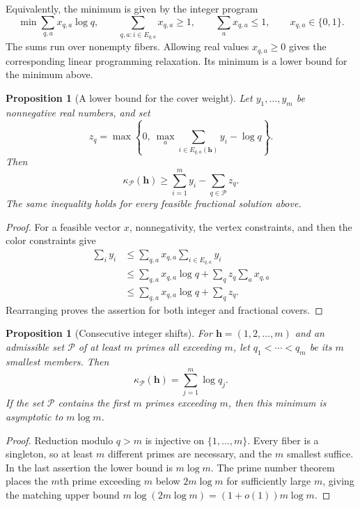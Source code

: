 \documentclass[11pt]{amsart}
\newtheorem{proposition}[theorem]{Proposition}
\theoremstyle{definition}
\theoremstyle{remark}
\begin{document}
Equivalently, the minimum is given by the integer program
\[
\min \sum_{q,a}x_{q,a}\log q,
\qquad
\sum_{q,a:i\in E_{q,a}}x_{q,a}\geq1,
\qquad
\sum_a x_{q,a}\leq1,
\qquad x_{q,a}\in\{0,1\}.
\]
The sums run over nonempty fibers. Allowing real values
$x_{q,a}\geq0$ gives the corresponding linear programming relaxation.
Its minimum is a lower bound for the minimum above.

\begin{proposition}[A lower bound for the cover weight]
\label{prop:dual}
Let $y_1,\ldots,y_m$ be nonnegative real numbers, and set
\[
z_q=\max\left\{0,\ \max_a\sum_{i\in E_{q,a}(\mathbf h)}y_i-\log q\right\}.
\]
Then
\[
\kappa_{\mathcal P}(\mathbf h)\geq\sum_{i=1}^m y_i-\sum_{q\in\mathcal P}z_q.
\]
The same inequality holds for every feasible fractional solution above.
\end{proposition}
\begin{proof}
For a feasible vector $x$, nonnegativity, the vertex constraints, and then
the color constraints give
\[
\begin{aligned}
\sum_i y_i
&\leq\sum_{q,a}x_{q,a}\sum_{i\in E_{q,a}}y_i\\
&\leq\sum_{q,a}x_{q,a}\log q+\sum_q z_q\sum_a x_{q,a}\\
&\leq\sum_{q,a}x_{q,a}\log q+\sum_qz_q.
\end{aligned}
\]
Rearranging proves the assertion for both integer and fractional covers.
\end{proof}

\begin{proposition}[Consecutive integer shifts]\label{prop:intervalshifts}
For $\mathbf h=(1,2,\ldots,m)$ and an admissible set $\mathcal P$ of at
least $m$ primes all exceeding $m$, let $q_1<\cdots<q_m$ be its $m$
smallest members. Then
\[
\kappa_{\mathcal P}(\mathbf h)=\sum_{j=1}^m\log q_j.
\]
If the set $\mathcal P$ contains the first $m$ primes exceeding $m$,
then this minimum is asymptotic to $m\log m$.
\end{proposition}
\begin{proof}
Reduction modulo $q>m$ is injective on $\{1,\ldots,m\}$. Every fiber is a
singleton, so at least $m$ different primes are necessary, and the $m$
smallest suffice. In the last assertion the lower bound is $m\log m$.
The prime number theorem places the $m$th prime exceeding $m$ below
$2m\log m$ for sufficiently large $m$, giving the matching upper bound
$m\log(2m\log m)=(1+o(1))m\log m$.
\end{proof}
\end{document}
